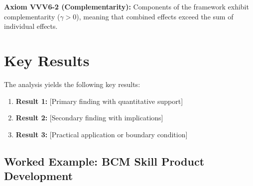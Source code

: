 \begin{tcolorbox}[colback=yellow!5!white,colframe=yellow!75!black,title=Axiom VVV6-2: Complementarity]
\textbf{Axiom VVV6-2 (Complementarity):}
Components of the framework exhibit complementarity ($\gamma > 0$), meaning
that combined effects exceed the sum of individual effects.
\end{tcolorbox}


\section{Key Results}
\label{sec:vvv6-results}

The analysis yields the following key results:

\begin{enumerate}
    \item \textbf{Result 1:} [Primary finding with quantitative support]
    \item \textbf{Result 2:} [Secondary finding with implications]
    \item \textbf{Result 3:} [Practical application or boundary condition]
\end{enumerate}


\subsection{Worked Example: BCM Skill Product Development}
\label{sec:vvv-worked-example}


